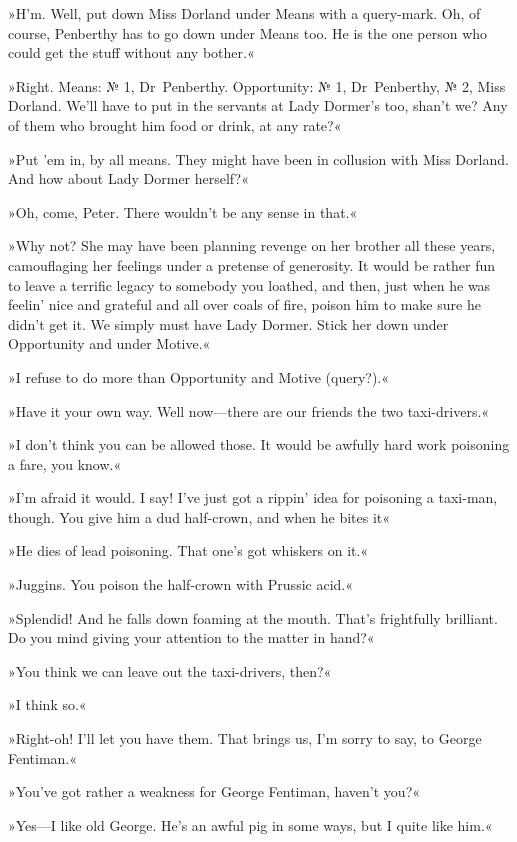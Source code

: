 »H'm. Well, put down Miss Dorland under Means with a query-mark. Oh, of course, Penberthy has to go down under Means too. He is the one person who could get the stuff without any bother.«

»Right. Means: № 1, Dr~Penberthy. Opportunity: № 1, Dr~Penberthy, № 2, Miss Dorland. We'll have to put in the servants at Lady Dormer's too, shan't we? Any of them who brought him food or drink, at any rate?«

»Put 'em in, by all means. They might have been in collusion with Miss Dorland. And how about Lady Dormer herself?«

»Oh, come, Peter. There wouldn't be any sense in that.«

»Why not? She may have been planning revenge on her brother all these years, camouflaging her feelings under a pretense of generosity. It would be rather fun to leave a terrific legacy to somebody you loathed, and then, just when he was feelin' nice and grateful and all over coals of fire, poison him to make sure he didn't get it. We simply must have Lady Dormer. Stick her down under Opportunity and under Motive.«

»I refuse to do more than Opportunity and Motive (query?).«

»Have it your own way. Well now—there are our friends the two taxi-drivers.«

»I don't think you can be allowed those. It would be awfully hard work poisoning a fare, you know.«

»I'm afraid it would. I say! I've just got a rippin' idea for poisoning a taxi-man, though. You give him a dud half-crown, and when he bites it\longdash«

»He dies of lead poisoning. That one's got whiskers on it.«

»Juggins. You poison the half-crown with Prussic acid.«

»Splendid! And he falls down foaming at the mouth. That's frightfully brilliant. Do you mind giving your attention to the matter in hand?«

»You think we can leave out the taxi-drivers, then?«

»I think so.«

»Right-oh! I'll let you have them. That brings us, I'm sorry to say, to George Fentiman.«

»You've got rather a weakness for George Fentiman, haven't you?«

»Yes—I like old George. He's an awful pig in some ways, but I quite like him.«

